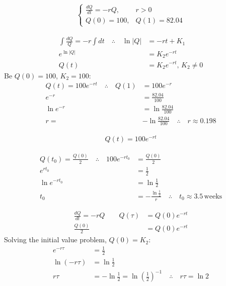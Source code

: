 \begin{solution}
	\begin{gather*}
		\begin{cases}
			\frac{dQ}{dt}=-rQ, & r > 0\\
			Q(0)=100, & Q(1)=82.04
		\end{cases}
	\end{gather*}
	\begin{solparts}
		\item
		\begin{align*}
			\int \frac{dQ}{Q}=-r\int dt \quad \therefore \quad \ln|Q|&=-rt+K_1\\
			e^{\ln|Q|}&=K_2e^{-rt}\\
			Q(t)&=K_2e^{-rt},\, K_2 \neq 0
		\end{align*}
		Be $Q(0)=100$, $K_2=100$:
		\begin{align*}
			Q(t)=100e^{-rt} \quad \therefore \quad Q(1)&=100e^{-r}\\
			e^{-r}&=\frac{82.04}{100}\\
			\ln e^{-r}&=\ln \frac{82.04}{100}\\
			r=&-\ln \frac{82.04}{100}\quad \therefore \quad \boxed{r\approx 0.198}
		\end{align*}
	
		\item
		\begin{gather*}
			\boxed{Q(t)=100e^{-rt}}
		\end{gather*}
	
		\item
		\begin{align*}
			Q(t_0)=\frac{Q(0)}{2} \quad \therefore \quad 100e^{-rt_0}&=\frac{Q(0)}{2}\\
			e^{rt_0}&=\frac{1}{2}\\
			\ln e^{-rt_0}&=\ln \frac{1}{2}\\
			t_0&=-\frac{\ln \frac{1}{2}}{r} \quad \therefore \quad \boxed{t_0 \approx 3.5\, \text{weeks}}
		\end{align*}
	\end{solparts}
\end{solution}

\begin{solution}
	\begin{align*}
		\frac{dQ}{dt}=-rQ \qquad Q(\tau)&=Q(0)e^{-rt}\\
		\frac{Q(0)}{2}&=Q(0)e^{-rt}
	\end{align*}
	Solving the initial value problem, $Q(0)=K_2$:
	\begin{align*}
		e^{-r\tau}&=\frac{1}{2}\\
		\ln (-r\tau)&=\ln \frac{1}{2}\\
		r\tau &= -\ln \frac{1}{2} = \ln \left(\frac{1}{2}\right)^{-1}\quad \therefore \quad \boxed{r\tau=\ln 2}\\
	\end{align*}
\end{solution}

